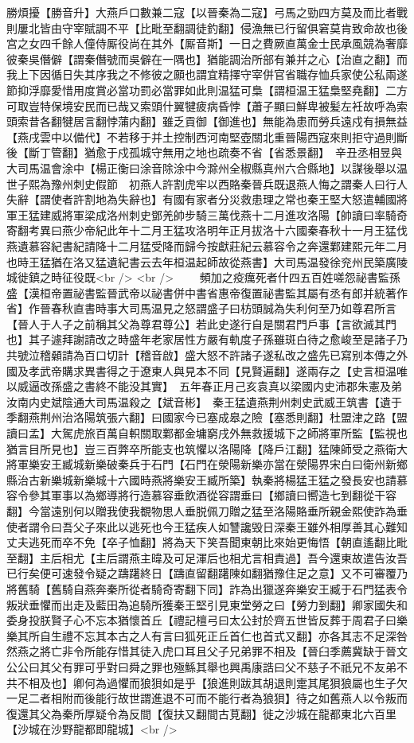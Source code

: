 勝煩擾【勝音升】大燕戶口數兼二寇【以晉秦為二寇】弓馬之勁四方莫及而比者戰則屢北皆由守宰賦調不平【比毗至翻調徒釣翻】侵漁無已行留俱窘莫肯致命故也後宫之女四千餘人僮侍厮役尚在其外【厮音斯】一日之費厥直萬金士民承風競為奢靡彼秦吳僭僻【謂秦僭號而吳僻在一隅也】猶能調治所部有兼并之心【治直之翻】而我上下因循日失其序我之不修彼之願也謂宜精擇守宰併官省職存恤兵家使公私兩遂節抑浮靡愛惜用度賞必當功罰必當罪如此則温猛可梟【謂桓温王猛梟堅堯翻】二方可取豈特保境安民而已哉又索頭什翼犍疲病昏悖【蕭子顯曰鮮卑被髪左衽故呼為索頭索昔各翻犍居言翻悖蒲内翻】雖乏貢御【御進也】無能為患而勞兵遠戍有損無益【燕戌雲中以備代】不若移于并土控制西河南堅壺關北重晉陽西寇來則拒守過則斷後【斷丁管翻】猶愈于戍孤城守無用之地也疏奏不省【省悉景翻】　辛丑丞相昱與大司馬温會涂中【楊正衡曰涂音除涂中今滁州全椒縣真州六合縣地】以謀後舉以温世子熙為豫州刺史假節　初燕人許割虎牢以西賂秦晉兵既退燕人悔之謂秦人曰行人失辭【謂使者許割地為失辭也】有國有家者分災救患理之常也秦王堅大怒遣輔國將軍王猛建威將軍梁成洛州刺史鄧羌帥步騎三萬伐燕十二月進攻洛陽【帥讀曰率騎奇寄翻考異曰燕少帝紀此年十二月王猛攻洛明年正月拔洛十六國秦春秋十一月王猛伐燕遺慕容紀書紀請降十二月猛受降而歸今按獻莊紀云慕容令之奔還鄴建熙元年二月也時王猛猶在洛又猛遺紀書云去年桓温起師故從燕書】大司馬温發徐兖州民築廣陵城徙鎮之時征役既<br />
<br />
　　頻加之疫癘死者什四五百姓嗟怨祕書監孫盛【漢桓帝置祕書監晉武帝以祕書併中書省惠帝復置祕書監其屬有丞有郎并統著作省】作晉春秋直書時事大司馬温見之怒謂盛子曰枋頭誠為失利何至乃如尊君所言【晉人于人子之前稱其父為尊君尊公】若此史遂行自是關君門戶事【言欲滅其門也】其子遽拜謝請改之時盛年老家居性方嚴有軌度子孫雖斑白待之愈峻至是諸子乃共號泣稽顙請為百口切計【稽音啟】盛大怒不許諸子遂私改之盛先已寫别本傳之外國及孝武帝購求異書得之于遼東人與見本不同【見賢遍翻】遂兩存之【史言桓温唯以威逼改孫盛之書終不能没其實】　五年春正月己亥袁真以梁國内史沛郡朱憲及弟汝南内史斌陰通大司馬温殺之【斌音彬】　秦王猛遺燕荆州刺史武威王筑書【遺于季翻燕荆州治洛陽筑張六翻】曰國家今已塞成皋之險【塞悉則翻】杜盟津之路【盟讀曰孟】大駕虎旅百萬自軹關取鄴都金墉窮戌外無救援城下之師將軍所監【監視也猶言目所見也】豈三百弊卒所能支也筑懼以洛陽降【降戶江翻】猛陳師受之燕衛大將軍樂安王臧城新樂破秦兵于石門【石門在滎陽新樂亦當在滎陽界宋白曰衛州新鄉縣治古新樂城新樂城十六國時燕將樂安王臧所築】執秦將楊猛王猛之發長安也請慕容令參其軍事以為鄉導將行造慕容垂飲酒從容謂垂曰【鄉讀曰嚮造七到翻從干容翻】今當遠别何以贈我使我覩物思人垂脱佩刀贈之猛至洛陽賂垂所親金熙使詐為垂使者謂令曰吾父子來此以逃死也今王猛疾人如讐讒毁日深秦王雖外相厚善其心難知丈夫逃死而卒不免【卒子恤翻】將為天下笑吾聞東朝比來始更悔悟【朝直遙翻比毗至翻】主后相尤【主后謂燕主暐及可足渾后也相尤言相責過】吾今還東故遣告汝吾已行矣便可速發令疑之躊躇終日【躊直留翻躇陳如翻猶豫住足之意】又不可審覆乃將舊騎【舊騎自燕奔秦所從者騎奇寄翻下同】詐為出獵遂奔樂安王臧于石門猛表令叛狀垂懼而出走及藍田為追騎所獲秦王堅引見東堂勞之曰【勞力到翻】卿家國失和委身投朕賢子心不忘本猶懷首丘【禮記檀弓曰太公封於齊五世皆反葬于周君子曰樂樂其所自生禮不忘其本古之人有言曰狐死正丘首仁也首式又翻】亦各其志不足深咎然燕之將亡非令所能存惜其徒入虎口耳且父子兄弟罪不相及【晉臼季薦冀缺于晉文公公曰其父有罪可乎對曰舜之罪也殛鯀其舉也興禹康誥曰父不慈子不祇兄不友弟不共不相及也】卿何為過懼而狼狽如是乎【狼進則跋其胡退則疐其尾狽狼屬也生子欠一足二者相附而後能行故世謂進退不可而不能行者為狼狽】待之如舊燕人以令叛而復還其父為秦所厚疑令為反間【復扶又翻間古莧翻】徙之沙城在龍都東北六百里【沙城在沙野龍都即龍城】<br />
